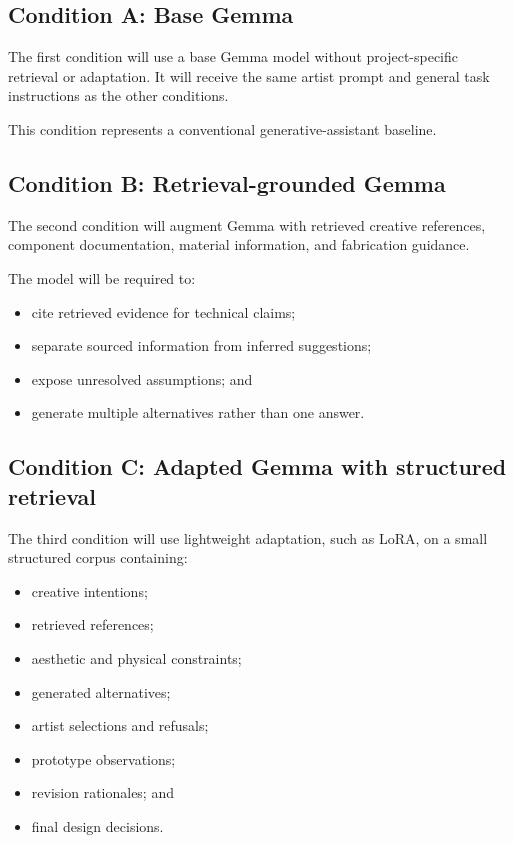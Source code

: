 \documentclass{article}
\begin{document}
\subsection{Condition A: Base Gemma}

The first condition will use a base Gemma model without project-specific
retrieval or adaptation. It will receive the same artist prompt and general
task instructions as the other conditions.

This condition represents a conventional generative-assistant baseline.

\subsection{Condition B: Retrieval-grounded Gemma}

The second condition will augment Gemma with retrieved creative references,
component documentation, material information, and fabrication guidance.

The model will be required to:

\begin{itemize}[leftmargin=*]
    \item cite retrieved evidence for technical claims;
    \item separate sourced information from inferred suggestions;
    \item expose unresolved assumptions; and
    \item generate multiple alternatives rather than one answer.
\end{itemize}

\subsection{Condition C: Adapted Gemma with structured retrieval}

The third condition will use lightweight adaptation, such as LoRA, on a small
structured corpus containing:

\begin{itemize}[leftmargin=*]
    \item creative intentions;
    \item retrieved references;
    \item aesthetic and physical constraints;
    \item generated alternatives;
    \item artist selections and refusals;
    \item prototype observations;
    \item revision rationales; and
    \item final design decisions.
\end{itemize}
\end{document}

